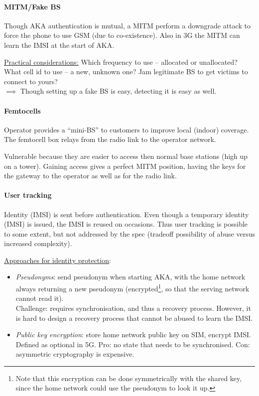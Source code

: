 \paragraph{MITM/Fake BS}
Though AKA authentication is mutual, a MITM perform a downgrade attack to force the phone to use GSM (due to co-existence).
Also in 3G the MITM can learn the IMSI at the start of AKA.

\underline{Practical considerations:}
Which frequency to use -- allocated or unallocated?
What cell id to use -- a new, unknown one?
Jam legitimate BS to get victims to connect to yours?
\\
$\implies$ Though setting up a fake BS is easy, detecting it is easy as well.

\paragraph{Femtocells}
Operator provides a ``mini-BS'' to customers to improve local (indoor) coverage.
The femtocell box relays from the radio link to the operator network.

Vulnerable because they are easier to access then normal base stations (high up on a tower).
Gaining access gives a perfect MITM position, having the keys for the gateway to the operator as well as for the radio link.

\paragraph{User tracking}
Identity (IMSI) is sent before authentication.
Even though a temporary identity (IMSI) is issued, the IMSI is reused on occasions.
Thus user tracking is possible to some extent, but not addressed by the spec (tradeoff possibility of abuse versus increased complexity).

\underline{Approaches for identity protection}:
\begin{itemize}
	\item \textit{Pseudonyms}: send pseudonym when starting AKA, with the home network always returning a new pseudonym
	(encrypted\footnote{Note that this encryption can be done symmetrically with the shared key, since the home network could use the pseudonym to look it up.}, so that the serving network cannot read it).\\
	Challenge: requires synchronisation, and thus a recovery process.
	However, it is hard to design a recovery process that cannot be abused to learn the IMSI.
	\item \textit{Public key encryption}: store home network public key on SIM, encrypt IMSI.
	Defined as optional in 5G.
	Pro: no state that needs to be synchronised.
	Con: asymmetric cryptography is expensive.
\end{itemize}


